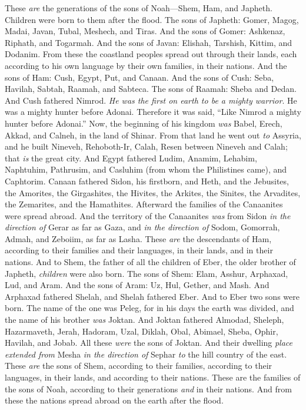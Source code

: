 \begin{biblechapter} %
 These \textit{are} the generations of the sons of Noah—Shem, Ham, and Japheth. Children were born to them after the flood.
\verse The sons of Japheth: Gomer, Magog, Madai, Javan, Tubal, Meshech, and Tiras.
\verse And the sons of Gomer: Ashkenaz, Riphath, and Togarmah.
\verse And the sons of Javan: Elishah, Tarshish, Kittim, and Dodanim.
\verse From these the coastland peoples spread out through their lands, each according to his own language by their own families, in their nations.
\verse And the sons of Ham: Cush, Egypt, Put, and Canaan.
\verse And the sons of Cush: Seba, Havilah, Sabtah, Raamah, and Sabteca. The sons of Raamah: Sheba and Dedan.
\verse And Cush fathered Nimrod. \textit{He was the first on earth to be a mighty warrior}.
\verse He was a mighty hunter before Adonai. Therefore it was said, “Like Nimrod a mighty hunter before Adonai.”
\verse Now, the beginning of his kingdom \textit{was} Babel, Erech, Akkad, and Calneh, in the land of Shinar.
\verse From that land he went out \textit{to} Assyria, and he built Nineveh, Rehoboth-Ir, Calah,
\verse Resen between Nineveh and Calah; that \textit{is} the great city.
\verse And Egypt fathered Ludim, Anamim, Lehabim, Naphtuhim,
\verse Pathrusim, and Casluhim (from whom the Philistines came), and Caphtorim.
\verse Canaan fathered Sidon, his firstborn, and Heth,
\verse and the Jebusites, the Amorites, the Girgashites,
\verse the Hivites, the Arkites, the Sinites,
\verse the Arvadites, the Zemarites, and the Hamathites. Afterward the families of the Canaanites were spread abroad.
\verse And the territory of the Canaanites \textit{was} from Sidon \textit{in the direction of} Gerar as far as Gaza, and \textit{in the direction of} Sodom, Gomorrah, Admah, and Zeboiim, as far as Lasha.
\verse These \textit{are} the descendants of Ham, according to their families and their languages, in their lands, and in their nations.
\verse And to Shem, the father of all the children of Eber, the older brother of Japheth, \textit{children} were also born.
\verse The sons of Shem: Elam, Asshur, Arphaxad, Lud, and Aram.
\verse And the sons of Aram: Uz, Hul, Gether, and Mash.
\verse And Arphaxad fathered Shelah, and Shelah fathered Eber.
\verse And to Eber two sons were born. The name of the one was Peleg, for in his days the earth was divided, and the name of his brother \textit{was} Joktan.
\verse And Joktan fathered Almodad, Sheleph, Hazarmaveth, Jerah,
\verse Hadoram, Uzal, Diklah,
\verse Obal, Abimael, Sheba,
\verse Ophir, Havilah, and Jobab. All these \textit{were} the sons of Joktan.
\verse And their dwelling \textit{place} \textit{extended from} Mesha \textit{in the direction of} Sephar \textit{to} the hill country of the east.
\verse These \textit{are} the sons of Shem, according to their families, according to their languages, in their lands, and according to their nations.
\verse These are the families of the sons of Noah, according to their generations \textit{and} in their nations. And from these the nations spread abroad on the earth after the flood.
\end{biblechapter}

